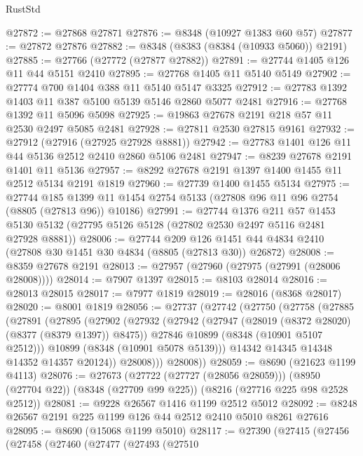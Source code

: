 \begin{lexlean}{RustStd}
\begin{coremodule}
@27872 := @27868 @27871
@27876 := @8348 (@10927 @1383 @60 @57)
@27877 := @27872 @27876
@27882 := @8348 (@8383 (@8384 (@10933 @5060)) @2191)
@27885 := @27766 (@27772 (@27877 @27882))
@27891 := @27744 @1405 @126 @11 @44 @5151 @2410
@27895 := @27768 @1405 @11 @5140 @5149
@27902 := @27774 @700 @1404 @388 @11 @5140 @5147 @3325
@27912 := @27783 @1392 @1403 @11 @387 @5100 @5139 @5146 @2860 @5077 @2481
@27916 := @27768 @1392 @11 @5096 @5098
@27925 := @19863 @27678 @2191 @218 @57 @11 @2530 @2497 @5085 @2481
@27928 := @27811 @2530 @27815 @9161
@27932 := @27912 (@27916 (@27925 @27928 @8881))
@27942 := @27783 @1401 @126 @11 @44 @5136 @2512 @2410 @2860 @5106 @2481
@27947 := @8239 @27678 @2191 @1401 @11 @5136
@27957 := @8292 @27678 @2191 @1397 @1400 @1455 @11 @2512 @5134 @2191 @1819
@27960 := @27739 @1400 @1455 @5134
@27975 := @27744
    @185
    @1399
    @11
    @1454
    @2754
    @5133
    (@27808 @96 @11 @96 @2754 (@8805 (@27813 @96)) @10186)
@27991 := @27744
    @1376
    @211
    @57
    @1453
    @5130
    @5132
    (@27795 @5126 @5128 (@27802 @2530 @2497 @5116 @2481 @27928 @8881))
@28006 := @27744
    @209
    @126
    @1451
    @44
    @4834
    @2410
    (@27808 @30 @1451 @30 @4834 (@8805 (@27813 @30)) @26872)
@28008 := @8359 @27678 @2191
@28013 := @27957 (@27960 (@27975 (@27991 (@28006 @28008))))
@28014 := @7907 @1397
@28015 := @8103 @28014
@28016 := @28013 @28015
@28017 := @7977 @1819
@28019 := @28016 (@8368 @28017)
@28020 := @8001 @1819
@28056 := @27737
    (@27742
      (@27750
        (@27758
          (@27885
            (@27891
              (@27895
                (@27902
                  (@27932
                    (@27942
                      (@27947 (@28019 (@8372 @28020) (@8377 (@8379 @1397)) @8475))
                      @27846
                      @10899
                      (@8348 (@10901 @5107 @2512)))
                    @10899
                    (@8348 (@10901 @5078 @5139)))
                  @14342
                  @14345
                  @14348
                  @14352
                  @14357
                  @20124))
              @28008)))
        @28008))
@28059 := @8690 (@21623 @1199 @4113)
@28076 := @27673
    (@27722 (@27727 (@28056 @28059)))
    (@8950 (@27704 @22))
    (@8348 (@27709 @99 @225))
    (@8216 (@27716 @225 @98 @2528 @2512))
@28081 := @9228 @26567 @1416 @1199 @2512 @5012
@28092 := @8248 @26567 @2191 @225 @1199 @126 @44 @2512 @2410 @5010 @8261 @27616
@28095 := @8690 (@15068 @1199 @5010)
@28117 := @27390
    (@27415
      (@27456
        (@27458
          (@27460
            (@27477
              (@27493
                (@27510

\end{coremodule}
\end{lexlean}
